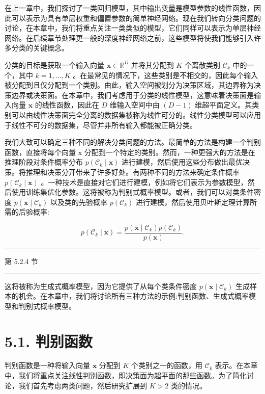 \documentclass[10pt]{report}
\newcommand{\HRule}{\begin{center}\rule{0.9\linewidth}{0.2mm}\end{center}}
\begin{document}
在上一章中，我们探讨了一类回归模型，其中输出变量是模型参数的线性函数，因此可以表示为具有单层权重和偏置参数的简单神经网络。现在我们转向分类问题的讨论，在本章中，我们将重点关注一类类似的模型，它们同样可以表示为单层神经网络。在后续章节处理更一般的深度神经网络之前，这些模型将使我们能够引入许多分类的关键概念。

分类的目标是获取一个输入向量 \(\mathbf{x} \in  {\mathbb{R}}^{D}\) 并将其分配到 \(K\) 个离散类别 \({\mathcal{C}}_{k}\) 中的一个，其中 \(k = 1,\ldots ,K\) 。在最常见的情况下，这些类别是不相交的，因此每个输入被分配到且仅分配到一个类别。由此，输入空间被划分为决策区域，其边界称为决策边界或决策面。在本章中，我们考虑用于分类的线性模型，这意味着决策面是输入向量 \(\mathbf{x}\) 的线性函数，因此在 \(D\) 维输入空间中由 \(\left( {D - 1}\right)\) 维超平面定义。其类别可以由线性决策面完全分离的数据集被称为线性可分的。线性分类模型可以应用于线性不可分的数据集，尽管并非所有输入都能被正确分类。

我们大致可以确定三种不同的解决分类问题的方法。最简单的方法是构建一个判别函数，直接将每个向量 \(\mathrm{x}\) 分配到一个特定的类别。然而，一种更强大的方法是在推理阶段对条件概率分布 \(p\left( {{\mathcal{C}}_{k} \mid  \mathbf{x}}\right)\) 进行建模，然后使用这些分布做出最优决策。将推理和决策分开带来了许多好处。有两种不同的方法来确定条件概率 \(p\left( {{\mathcal{C}}_{k} \mid  \mathbf{x}}\right)\) 。一种技术是直接对它们进行建模，例如将它们表示为参数模型，然后使用训练集优化参数。这将被称为判别式概率模型。或者，我们可以对类条件密度 \(p\left( {\mathbf{x} \mid  {\mathcal{C}}_{k}}\right)\) 以及类的先验概率 \(p\left( {\mathcal{C}}_{k}\right)\) 进行建模，然后使用贝叶斯定理计算所需的后验概率:

\[
p\left( {{\mathcal{C}}_{k} \mid  \mathbf{x}}\right)  = \frac{p\left( {\mathbf{x} \mid  {\mathcal{C}}_{k}}\right) p\left( {\mathcal{C}}_{k}\right) }{p\left( \mathbf{x}\right) }. \tag{5.1}
\]

\HRule

第 5.2.4 节

\HRule

这将被称为生成式概率模型，因为它提供了从每个类条件密度 \(p\left( {\mathbf{x} \mid  {\mathcal{C}}_{k}}\right)\) 生成样本的机会。在本章中，我们将讨论所有三种方法的示例:判别函数、生成式概率模型和判别式概率模型。

\section*{5.1. 判别函数}

判别函数是一种将输入向量 \(\mathbf{x}\) 分配到 \(K\) 个类别之一的函数，用 \({\mathcal{C}}_{k}\) 表示。在本章中，我们将重点关注线性判别函数，即决策面为超平面的那些函数。为了简化讨论，我们首先考虑两类问题，然后研究扩展到 \(K > 2\) 类的情况。
\end{document}
